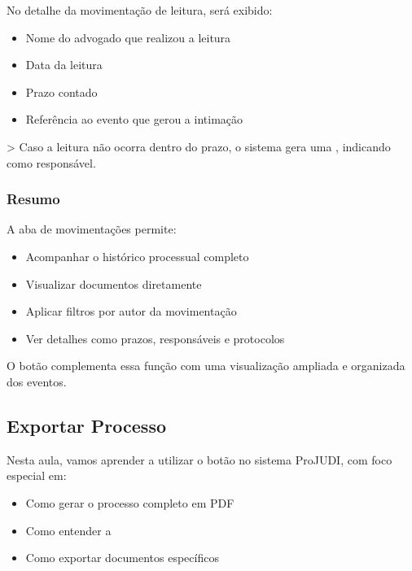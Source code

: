 \documentclass[letterpaper,10pt,brazil]{sphinxmanual}
\begin{document}
\sphinxAtStartPar
No detalhe da movimentação de leitura, será exibido:
\begin{itemize}
\item {} 
\sphinxAtStartPar
Nome do advogado que realizou a leitura

\item {} 
\sphinxAtStartPar
Data da leitura

\item {} 
\sphinxAtStartPar
Prazo contado

\item {} 
\sphinxAtStartPar
Referência ao evento que gerou a intimação

\end{itemize}

\sphinxAtStartPar
\textgreater{} Caso a leitura não ocorra dentro do prazo, o sistema gera uma , indicando  como responsável.


\subsubsection{Resumo}
\label{\detokenize{projud_17_visualizandomovimentos:resumo}}
\sphinxAtStartPar
A aba de movimentações permite:
\begin{itemize}
\item {} 
\sphinxAtStartPar
Acompanhar o histórico processual completo

\item {} 
\sphinxAtStartPar
Visualizar documentos diretamente

\item {} 
\sphinxAtStartPar
Aplicar filtros por autor da movimentação

\item {} 
\sphinxAtStartPar
Ver detalhes como prazos, responsáveis e protocolos

\end{itemize}

\sphinxAtStartPar
O botão  complementa essa função com uma visualização ampliada e organizada dos eventos.

\sphinxstepscope


\subsection{Exportar Processo}
\label{\detokenize{projud_18_exportarprocesso:exportar-processo}}\label{\detokenize{projud_18_exportarprocesso::doc}}
\sphinxAtStartPar
Nesta aula, vamos aprender a utilizar o botão  no sistema ProJUDI, com foco especial em:
\begin{itemize}
\item {} 
\sphinxAtStartPar
Como gerar o processo completo em PDF

\item {} 
\sphinxAtStartPar
Como entender a 

\item {} 
\sphinxAtStartPar
Como exportar documentos específicos

\end{itemize}
\end{document}
